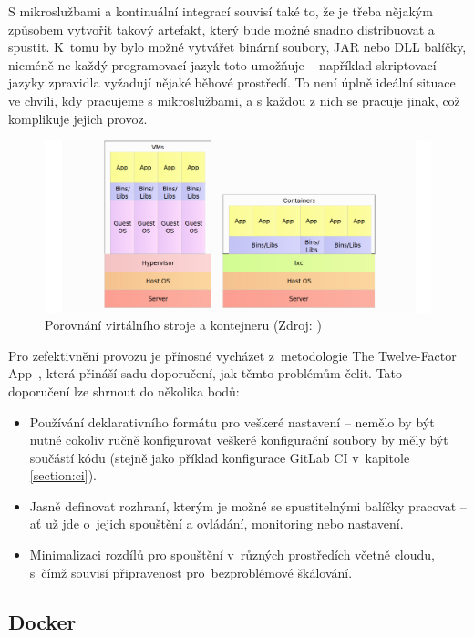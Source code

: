 \documentclass[FM,DP]{tulthesis}
\begin{document}
S mikroslužbami a kontinuální integrací souvisí také to, že je třeba nějakým způsobem vytvořit takový artefakt, 
který bude možné snadno distribuovat a spustit. K~tomu by bylo možné vytvářet binární soubory, JAR nebo DLL
balíčky, nicméně ne každý programovací jazyk toto umožňuje -- například skriptovací jazyky zpravidla
vyžadují nějaké běhové prostředí. To není úplně ideální situace ve chvíli, kdy pracujeme s mikroslužbami, 
a s každou z nich se pracuje jinak, což komplikuje jejich provoz. 

\begin{figure}[h]
\center
\includegraphics[width=\textwidth]{container-vs-vm.png}
\caption{Porovnání virtálního stroje a kontejneru (Zdroj: \cite[strana~68]{devops})}
\label{container-vs-vm}
\end{figure}

Pro zefektivnění provozu je přínosné vycházet z~metodologie The Twelve-Factor App~\cite{12factor}, 
která přináší sadu doporučení, jak těmto problémům čelit. Tato doporučení lze shrnout do několika bodů:

\begin{itemize}
\item Používání deklarativního formátu pro veškeré nastavení -- nemělo by být nutné cokoliv ručně konfigurovat
veškeré konfigurační soubory by měly být součástí kódu (stejně jako příklad konfigurace GitLab CI v~kapitole
\ref{section:ci}).
\item Jasně definovat rozhraní, kterým je možné se spustitelnými balíčky pracovat -- ať už jde o~jejich spouštění
a ovládání, monitoring nebo nastavení.
\item Minimalizaci rozdílů pro spouštění v~různých prostředích včetně cloudu, s~čímž souvisí připravenost
pro~bezproblémové škálování.
\end{itemize}

\subsection{Docker}
\end{document}
